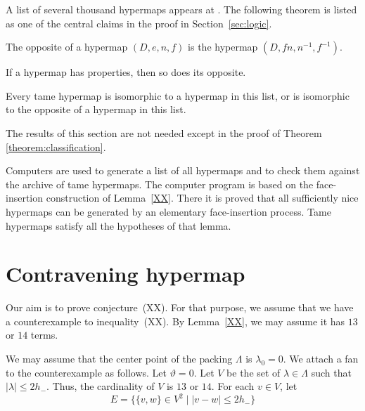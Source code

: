 \label{sec:classification}

A list of several thousand hypermaps appears at \cite{web}. The
following theorem is listed as one of the central claims in the
proof in Section~\ref{sec:logic}.

\begin{definition}[opposite] The opposite of a hypermap $(D,e,n,f)$ is the
hypermap $(D,f n,n^{-1},f^{-1})$.
\end{definition}

\begin{lemma} If a hypermap has properties, 
then so does its opposite.
\end{lemma}

\begin{theorem}
\label{theorem:classification} Every tame hypermap is isomorphic to
a hypermap in this list, or is isomorphic to the opposite of a
hypermap in this list.
\end{theorem}

The results of this section are not needed except in the proof of
Theorem \ref{theorem:classification}.

\smallskip

Computers are used to generate a list of all hypermaps and to check
them against the archive of tame hypermaps.  The computer program is
based on the face-insertion construction of Lemma~\ref{XX}.  There it is
proved that all sufficiently nice hypermaps can be generated by an
elementary face-insertion process.  Tame hypermaps satisfy all the
hypotheses of that lemma.

\section{Contravening hypermap}

Our aim is to prove conjecture~(XX).  For that purpose, we assume that
we have a counterexample to inequality~(XX).  By Lemma~\ref{XX}, we
may assume it 
has $13$ or $14$ terms.  

We may assume that the center point of the packing $\Lambda$
is $\lambda_0=0$.
We attach a fan to the counterexample as follows.  
Let $\vartheta=0$.
Let $V$ be the set of $\lambda\in\Lambda$ such that
$|\lambda|\le 2h_-$.  Thus, the cardinality of $V$ is $13$ or $14$.
For each $v\in V$, let 
\begin{equation}\label{eqn:fan-edge}
 E = \{\{v,w\}\in V^2\mid |v-w|\le 2h_- \}
\end{equation}

